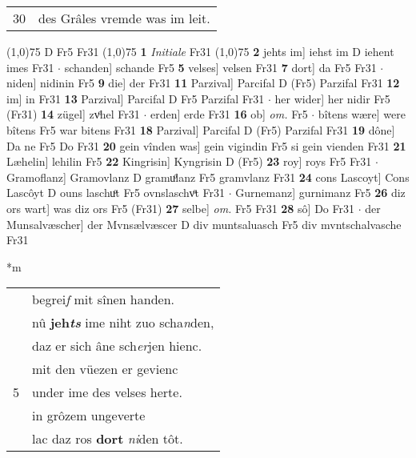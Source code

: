 \documentclass[8pt,a4paper,notitlepage]{article}
\begin{document}
\begin{table}[ht]
\begin{minipage}[t]{0.5\linewidth}
\begin{tabular}{rl}
30 & des Grâles vremde was im leit.\\ 
\end{tabular}
\scriptsize
\line(1,0){75} \newline
D Fr5 Fr31 \newline
\line(1,0){75} \newline
\textbf{1} \textit{Initiale} Fr31  \newline
\line(1,0){75} \newline
\textbf{2} jehts im] iehst im D iehent imes Fr31  $\cdot$ schanden] schande Fr5 \textbf{5} velses] velsen Fr31 \textbf{7} dort] da Fr5 Fr31  $\cdot$ niden] nidinin Fr5 \textbf{9} die] der Fr31 \textbf{11} Parzival] Parcifal D (Fr5) Parzifal Fr31 \textbf{12} im] in Fr31 \textbf{13} Parzival] Parcifal D Fr5 Parzifal Fr31  $\cdot$ her wider] her nidir Fr5 (Fr31) \textbf{14} zügel] zvͦhel Fr31  $\cdot$ erden] erde Fr31 \textbf{16} ob] \textit{om.} Fr5  $\cdot$ bîtens wære] were bîtens Fr5 war bitens Fr31 \textbf{18} Parzival] Parcifal D (Fr5) Parzifal Fr31 \textbf{19} dône] Da ne Fr5 Do Fr31 \textbf{20} gein vînden was] gein vigindin Fr5 si gein vienden Fr31 \textbf{21} Læhelin] lehilin Fr5 \textbf{22} Kingrisin] Kyngrisin D (Fr5) \textbf{23} roy] roys Fr5 Fr31  $\cdot$ Gramoflanz] Gramovlanz D gramuͦlanz Fr5 gramvlanz Fr31 \textbf{24} cons Lascoyt] Cons Lascôyt D ouns laschuͦt Fr5 ovnslaschvͦt Fr31  $\cdot$ Gurnemanz] gurnimanz Fr5 \textbf{26} diz ors wart] was diz ors Fr5 (Fr31) \textbf{27} selbe] \textit{om.} Fr5 Fr31 \textbf{28} sô] Do Fr31  $\cdot$ der Munsalvæscher] der Mvnsælvæscer D div muntsaluasch Fr5 div mvntschalvasche Fr31 \newline
\end{minipage}
\hspace{0.5cm}
\begin{minipage}[t]{0.5\linewidth}
\small
\begin{center}*m
\end{center}
\begin{tabular}{rl}
 & begrei\textit{f} mit sînen handen.\\ 
 & nû \textbf{jeh\textit{ts}} ime niht zuo scha\textit{n}den,\\ 
 & daz er sich âne sch\textit{er}jen hienc.\\ 
 & mit den vüezen er gevienc\\ 
5 & under ime des velses herte.\\ 
 & in grôzem ungeverte\\ 
 & lac daz ros \textbf{dort} \textit{ni}den tôt.\\ 

\end{tabular}
\end{minipage}
\end{table}
\end{document}

